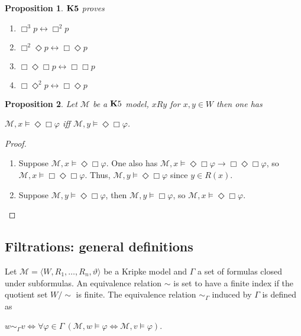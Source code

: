 \documentclass[a4paper]{article}
\theoremstyle{defin}
\theoremstyle{theorem}
\theoremstyle{prop}
\newtheorem{prop}{Proposition}
\theoremstyle{lemma}
\theoremstyle{ex}
\theoremstyle{col}
\begin{document}
\begin{prop} \label{K5proves}
  ${\bf K5}$ proves
  \begin{enumerate}
    \item $\Box^3 p \leftrightarrow \Box^2 p$
    \item $\Box^2 \Diamond p \leftrightarrow \Box \Diamond p$
    \item $\Box \Diamond \Box p \leftrightarrow \Box \Box p$
    \item $\Box \Diamond^2 p \leftrightarrow \Box \Diamond p$
  \end{enumerate}
\end{prop}

\begin{prop} \label{k5useful}
  Let $\mathcal{M}$ be a ${\bf K}5$ model, $x R y$ for $x, y \in W$ then one has
  \begin{center}
    $\mathcal{M}, x \models \Diamond \Box \varphi$ iff $\mathcal{M}, y \models \Diamond \Box \varphi$.
  \end{center}
\end{prop}

\begin{proof}
$ $

  \begin{enumerate}
    \item Suppose $\mathcal{M}, x \models \Diamond \Box \varphi$. One also has $\mathcal{M}, x \models \Diamond \Box \varphi \to \Box \Diamond \Box \varphi$, so $\mathcal{M}, x \models \Box \Diamond \Box \varphi$. Thus, $\mathcal{M}, y \models \Diamond \Box \varphi$ since $y \in R(x)$.
    \item Suppose $\mathcal{M}, y \models \Diamond \Box \varphi$, then $\mathcal{M}, y \models \Box \varphi$, so $\mathcal{M}, x \models \Diamond \Box \varphi$.
  \end{enumerate}
\end{proof}

\subsection{Filtrations: general definitions}

Let $\mathcal{M} = \langle W, R_1, \dots, R_n, \vartheta \rangle$ be a Kripke model and $\Gamma$ a set of formulas closed under subformulas. An equivalence relation $\sim$ is set to have a finite index if the quotient set $W / \sim$ is finite. The equivalence relation $\sim_{\Gamma}$ induced by $\Gamma$ is defined as

\begin{center}
  $w \sim_{\Gamma} v \Leftrightarrow \forall \varphi \in \Gamma \: (\mathcal{M}, w \models \varphi \Leftrightarrow \mathcal{M}, v \models \varphi)$.
\end{center}
\end{document}

